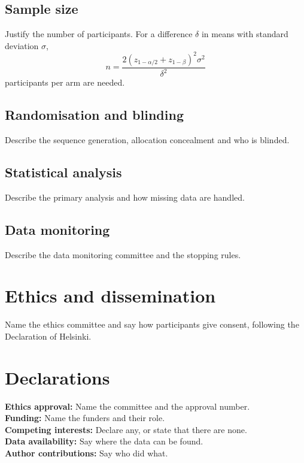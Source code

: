 \documentclass[11pt,a4paper]{article}
\begin{document}
\subsection{Sample size}
Justify the number of participants. For a difference $\delta$ in means with
standard deviation $\sigma$,
\begin{equation}
  n = \frac{2 (z_{1-\alpha/2} + z_{1-\beta})^2 \sigma^2}{\delta^2}
\end{equation}
participants per arm are needed.

\subsection{Randomisation and blinding}
Describe the sequence generation, allocation concealment and who is blinded.

\subsection{Statistical analysis}
Describe the primary analysis and how missing data are handled.

\subsection{Data monitoring}
Describe the data monitoring committee and the stopping rules.

\section{Ethics and dissemination}
Name the ethics committee and say how participants give consent, following the
Declaration of Helsinki.\cite{wma2013helsinki}

\section*{Declarations}
\noindent\textbf{Ethics approval:} Name the committee and the approval number.\\
\textbf{Funding:} Name the funders and their role.\\
\textbf{Competing interests:} Declare any, or state that there are none.\\
\textbf{Data availability:} Say where the data can be found.\\
\textbf{Author contributions:} Say who did what.



\end{document}
